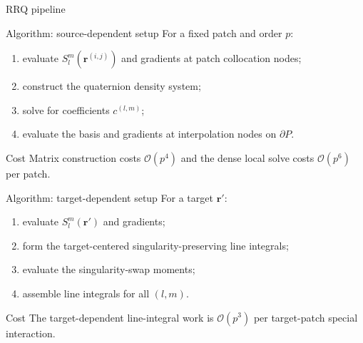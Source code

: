 \documentclass[aspectratio=169,11pt]{beamer}
\newcommand{\cO}{\mathcal{O}}
\newcommand{\rvec}{\bm{r}}
\newcommand{\rp}{\bm{r}'}
\begin{document}
\begin{frame}{RRQ pipeline}
\centering
{}
\end{frame}

\begin{frame}{Algorithm: source-dependent setup}
\small
For a fixed patch and order $p$:
\begin{enumerate}
  \item evaluate $S_l^m(\rvec^{(i,j)})$ and gradients at patch collocation nodes;
  \item construct the quaternion density system;
  \item solve for coefficients $c^{(l,m)}$;
  \item evaluate the basis and gradients at interpolation nodes on $\partial P$.
\end{enumerate}

\begin{block}{Cost}
Matrix construction costs $\cO(p^4)$ and the dense local solve costs
$\cO(p^6)$ per patch.
\end{block}
\end{frame}

\begin{frame}{Algorithm: target-dependent setup}
\small
For a target $\rp$:
\begin{enumerate}
  \item evaluate $S_l^m(\rp)$ and gradients;
  \item form the target-centered singularity-preserving line integrals;
  \item evaluate the singularity-swap moments;
  \item assemble line integrals for all $(l,m)$.
\end{enumerate}

\begin{block}{Cost}
The target-dependent line-integral work is $\cO(p^3)$ per target-patch
special interaction.
\end{block}
\end{frame}
\end{document}
